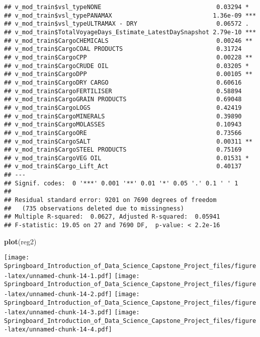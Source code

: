 \documentclass[]{article}
\newenvironment{Shaded}{\begin{snugshade}}{\end{snugshade}}
\newcommand{\KeywordTok}[1]{\textcolor[rgb]{0.13,0.29,0.53}{\textbf{#1}}}
\newcommand{\NormalTok}[1]{#1}
\begin{document}
\begin{verbatim}
## v_mod_train$vsl_typeNONE                                0.03294 *  
## v_mod_train$vsl_typePANAMAX                            1.36e-09 ***
## v_mod_train$vsl_typeULTRAMAX - DRY                      0.06572 .  
## v_mod_train$TotalVoyageDays_Estimate_LatestDaySnapshot 2.79e-10 ***
## v_mod_train$CargoCHEMICALS                              0.00246 ** 
## v_mod_train$CargoCOAL PRODUCTS                          0.31724    
## v_mod_train$CargoCPP                                    0.00228 ** 
## v_mod_train$CargoCRUDE OIL                              0.03205 *  
## v_mod_train$CargoDPP                                    0.00105 ** 
## v_mod_train$CargoDRY CARGO                              0.60616    
## v_mod_train$CargoFERTILISER                             0.58894    
## v_mod_train$CargoGRAIN PRODUCTS                         0.69048    
## v_mod_train$CargoLOGS                                   0.42419    
## v_mod_train$CargoMINERALS                               0.39890    
## v_mod_train$CargoMOLASSES                               0.10943    
## v_mod_train$CargoORE                                    0.73566    
## v_mod_train$CargoSALT                                   0.00311 ** 
## v_mod_train$CargoSTEEL PRODUCTS                         0.75169    
## v_mod_train$CargoVEG OIL                                0.01531 *  
## v_mod_train$Cargo_Lift_Act                              0.40137    
## ---
## Signif. codes:  0 '***' 0.001 '**' 0.01 '*' 0.05 '.' 0.1 ' ' 1
## 
## Residual standard error: 9201 on 7690 degrees of freedom
##   (735 observations deleted due to missingness)
## Multiple R-squared:  0.0627, Adjusted R-squared:  0.05941 
## F-statistic: 19.05 on 27 and 7690 DF,  p-value: < 2.2e-16
\end{verbatim}

\begin{Shaded}
\begin{Highlighting}[]
\KeywordTok{plot}\NormalTok{(reg2)}
\end{Highlighting}
\end{Shaded}

\texttt{[image: Springboard\_Introduction\_of\_Data\_Science\_Capstone\_Project\_files/figure-latex/unnamed-chunk-14-1.pdf]}
\texttt{[image: Springboard\_Introduction\_of\_Data\_Science\_Capstone\_Project\_files/figure-latex/unnamed-chunk-14-2.pdf]}
\texttt{[image: Springboard\_Introduction\_of\_Data\_Science\_Capstone\_Project\_files/figure-latex/unnamed-chunk-14-3.pdf]}
\texttt{[image: Springboard\_Introduction\_of\_Data\_Science\_Capstone\_Project\_files/figure-latex/unnamed-chunk-14-4.pdf]}
\end{document}
